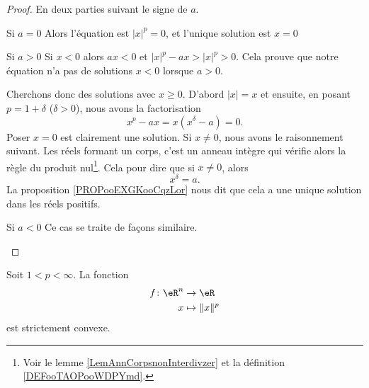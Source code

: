 \begin{proof}
    En deux parties suivant le signe de \( a\).
    \begin{subproof}
        \item[Si \( a=0\)]
            Alors l'équation est \( | x |^p=0\), et l'unique solution est \( x=0\)
        \item[Si \( a>0\)]
            Si \( x<0\) alors \( ax<0\) et \( | x |^p-ax>| x |^p>0\). Cela prouve que notre équation n'a pas de solutions \( x<0\) lorsque \( a>0\).

            Cherchons donc des solutions avec \( x\geq 0\). D'abord \( | x |=x\) et ensuite, en posant \( p=1+\delta\) (\( \delta>0\)), nous avons la factorisation
            \begin{equation}
                x^p-ax=x(x^{\delta}-a)=0.
            \end{equation}
            Poser \( x=0\) est clairement une solution. Si \( x\neq 0\), nous avons le raisonnement suivant. Les réels formant un corps, c'est un anneau intègre qui vérifie alors la règle du produit nul\footnote{Voir le lemme \ref{LemAnnCorpsnonInterdivzer} et la définition \ref{DEFooTAOPooWDPYmd}.}. Cela pour dire que si \( x\neq 0\), alors
            \begin{equation}
                x^{\delta}=a.
            \end{equation}
            La proposition \ref{PROPooEXGKooCqzLor} nous dit que cela a une unique solution dans les réels positifs.
        \item[Si \( a<0\)] Ce cas se traite de façons similaire.
    \end{subproof}
\end{proof}

\begin{proposition}     \label{PROPooLIGIooPrHYlb}
    Soit \( 1<p<\infty\). La fonction
    \begin{equation}
        \begin{aligned}
            f\colon \eR^n & \to \eR     \\
                      x   & \mapsto \| x \|^p
        \end{aligned}
    \end{equation}
    est strictement convexe.
\end{proposition}

